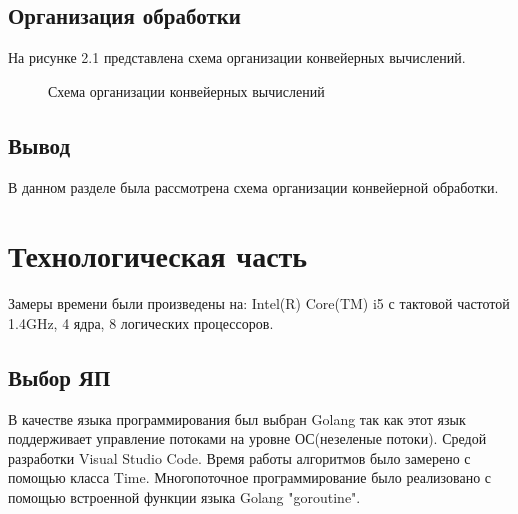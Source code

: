\documentclass[12pt]{report}
\begin{document}
\section{Организация обработки}
На рисунке 2.1 представлена схема организации конвейерных вычислений.
\begin{figure}[H]
	\caption{Схема организации конвейерных вычислений}
	\label{fig:v_st}
\end{figure}


\section{Вывод}
В данном разделе была рассмотрена схема организации конвейерной обработки.

 

\chapter{Технологическая часть}
Замеры времени были произведены на: Intel(R) Core(TM) i5 с тактовой частотой 1.4GHz, 4 ядра, 8 логических процессоров.

\section{Выбор ЯП}
В качестве языка программирования был выбран Golang  так как этот
язык поддерживает управление потоками на уровне ОС(незеленые потоки).\cite{Microsoft} Средой разработки Visual Studio Code. 
Время работы алгоритмов было замерено с помощью класса Time. Многопоточное программирование было
реализовано с помощью встроенной функции языка Golang "goroutine".
\end{document}
